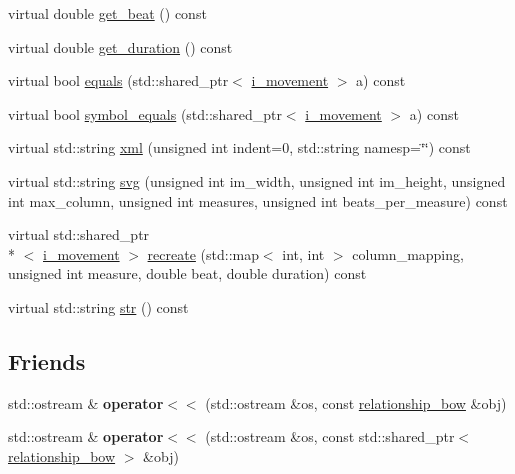 \begin{DoxyCompactItemize}
\item 
virtual double \hyperlink{classmae_1_1fl_1_1laban_1_1relationship__bow_a0fe4d1a9fd99e3c2e5daab7c5e3ffb6a}{get\-\_\-beat} () const 
\item 
virtual double \hyperlink{classmae_1_1fl_1_1laban_1_1relationship__bow_a6d9b6feb5125d37faf2b2ef545a0b02d}{get\-\_\-duration} () const 
\item 
virtual bool \hyperlink{classmae_1_1fl_1_1laban_1_1relationship__bow_a528d367eeff4bfcff462b201187b3bfc}{equals} (std\-::shared\-\_\-ptr$<$ \hyperlink{classmae_1_1fl_1_1laban_1_1i__movement}{i\-\_\-movement} $>$ a) const 
\item 
virtual bool \hyperlink{classmae_1_1fl_1_1laban_1_1relationship__bow_afe24aac808ed21243b9d277a14adeddd}{symbol\-\_\-equals} (std\-::shared\-\_\-ptr$<$ \hyperlink{classmae_1_1fl_1_1laban_1_1i__movement}{i\-\_\-movement} $>$ a) const 
\item 
virtual std\-::string \hyperlink{classmae_1_1fl_1_1laban_1_1relationship__bow_abbeedd0547a85cbe136dce511fba09e7}{xml} (unsigned int indent=0, std\-::string namesp=\char`\"{}\char`\"{}) const 
\item 
virtual std\-::string \hyperlink{classmae_1_1fl_1_1laban_1_1relationship__bow_a8ddd7d1102dcf7989b265f7b2b50f1a1}{svg} (unsigned int im\-\_\-width, unsigned int im\-\_\-height, unsigned int max\-\_\-column, unsigned int measures, unsigned int beats\-\_\-per\-\_\-measure) const 
\item 
virtual std\-::shared\-\_\-ptr\\*
$<$ \hyperlink{classmae_1_1fl_1_1laban_1_1i__movement}{i\-\_\-movement} $>$ \hyperlink{classmae_1_1fl_1_1laban_1_1relationship__bow_a7c7cd12c0eb3dd279587f02e2eb6151f}{recreate} (std\-::map$<$ int, int $>$ column\-\_\-mapping, unsigned int measure, double beat, double duration) const 
\item 
virtual std\-::string \hyperlink{classmae_1_1fl_1_1laban_1_1relationship__bow_a704b3d739a34b7fcbf6aee9f70f474bb}{str} () const 
\end{DoxyCompactItemize}
\subsection*{Friends}
\begin{DoxyCompactItemize}
\item 
\hypertarget{classmae_1_1fl_1_1laban_1_1relationship__bow_a1b75abf13ab7a8bff7021713207afeca}{std\-::ostream \& {\bfseries operator$<$$<$} (std\-::ostream \&os, const \hyperlink{classmae_1_1fl_1_1laban_1_1relationship__bow}{relationship\-\_\-bow} \&obj)}\label{classmae_1_1fl_1_1laban_1_1relationship__bow_a1b75abf13ab7a8bff7021713207afeca}

\item 
\hypertarget{classmae_1_1fl_1_1laban_1_1relationship__bow_ae5eb7cf9d452ba6150130d77bb319a32}{std\-::ostream \& {\bfseries operator$<$$<$} (std\-::ostream \&os, const std\-::shared\-\_\-ptr$<$ \hyperlink{classmae_1_1fl_1_1laban_1_1relationship__bow}{relationship\-\_\-bow} $>$ \&obj)}\label{classmae_1_1fl_1_1laban_1_1relationship__bow_ae5eb7cf9d452ba6150130d77bb319a32}

\end{DoxyCompactItemize}


